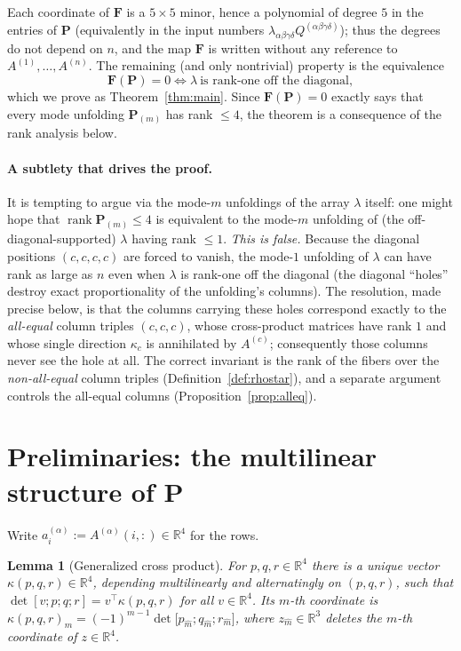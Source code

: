 \documentclass[12pt]{article}
\DeclareMathOperator{\rank}{rank}
\newcommand{\bR}{\mathbb{R}}
\newtheorem{lemma}{Lemma}
\theoremstyle{definition}
\begin{document}
Each coordinate of $\mathbf F$ is a $5\times5$ minor, hence a polynomial of degree
$5$ in the entries of $\mathbf P$ (equivalently in the input numbers
$\lambda_{\alpha\beta\gamma\delta}Q^{(\alpha\beta\gamma\delta)}$); thus the
degrees do not depend on $n$, and the map $\mathbf F$ is written without any
reference to $A^{(1)},\dots,A^{(n)}$.  The remaining (and only nontrivial)
property is the equivalence
\begin{equation}\label{eq:goal}
\mathbf F(\mathbf P)=0
\iff
\lambda\ \text{is rank-one off the diagonal},
\end{equation}
which we prove as Theorem~\ref{thm:main}.  Since $\mathbf F(\mathbf P)=0$ exactly
says that every mode unfolding $\mathbf P_{(m)}$ has rank $\le 4$, the theorem is a
consequence of the rank analysis below.

\paragraph{A subtlety that drives the proof.}
It is tempting to argue via the mode-$m$ unfoldings of the array $\lambda$ itself:
one might hope that $\rank\mathbf P_{(m)}\le4$ is equivalent to the mode-$m$
unfolding of (the off-diagonal-supported) $\lambda$ having rank $\le1$.  \emph{This
is false.}  Because the diagonal positions $(c,c,c,c)$ are forced to vanish, the
mode-$1$ unfolding of $\lambda$ can have rank as large as $n$ even when $\lambda$ is
rank-one off the diagonal (the diagonal ``holes'' destroy exact proportionality of
the unfolding's columns).  The resolution, made precise below, is that the columns
carrying these holes correspond exactly to the \emph{all-equal} column triples
$(c,c,c)$, whose cross-product matrices have rank $1$ and whose single direction
$\kappa_c$ is annihilated by $A^{(c)}$; consequently those columns never see the
hole at all.  The correct invariant is the rank of the fibers over the
\emph{non-all-equal} column triples (Definition~\ref{def:rhostar}), and a separate
argument controls the all-equal columns (Proposition~\ref{prop:alleq}).

\section{Preliminaries: the multilinear structure of $\mathbf P$}

Write $a^{(\alpha)}_i:=A^{(\alpha)}(i,:)\in\bR^4$ for the rows.

\begin{lemma}[Generalized cross product]\label{lem:cross}
For $p,q,r\in\bR^4$ there is a unique vector
$\kappa(p,q,r)\in\bR^4$, depending multilinearly and alternatingly on $(p,q,r)$,
such that
$\det[v;p;q;r]=v^{\top}\kappa(p,q,r)$ for all $v\in\bR^4$.  Its $m$-th coordinate
is $\kappa(p,q,r)_m=(-1)^{m-1}\det\bigl[p_{\widehat m};q_{\widehat m};r_{\widehat m}\bigr]$,
where $z_{\widehat m}\in\bR^3$ deletes the $m$-th coordinate of $z\in\bR^4$.
\end{lemma}
\end{document}
